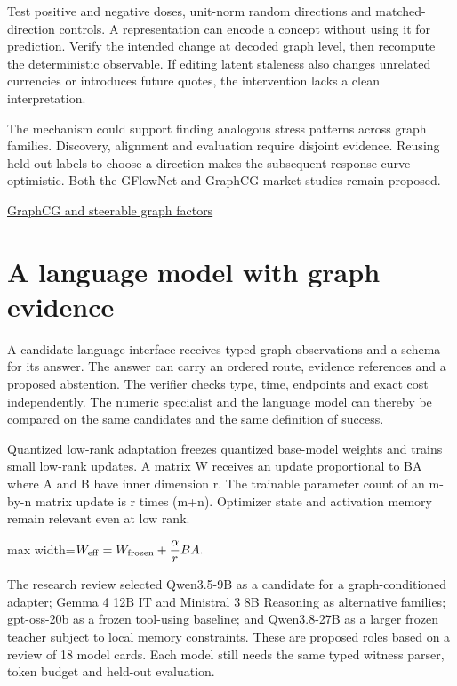 \documentclass[11pt,oneside,openany]{book}
\begin{document}
Test positive and negative doses, unit-norm random directions and matched-direction controls. A representation can encode a concept without using it for prediction. Verify the intended change at decoded graph level, then recompute the deterministic observable. If editing latent staleness also changes unrelated currencies or introduces future quotes, the intervention lacks a clean interpretation.

The mechanism could support finding analogous stress patterns across graph families. Discovery, alignment and evaluation require disjoint evidence. Reusing held-out labels to choose a direction makes the subsequent response curve optimistic. Both the GFlowNet and GraphCG market studies remain proposed.

{\small\sffamily\href{https://arxiv.org/abs/2401.17123}{GraphCG and steerable graph factors}\par}
\chapter{A language model with graph evidence}
A candidate language interface receives typed graph observations and a schema for its answer. The answer can carry an ordered route, evidence references and a proposed abstention. The verifier checks type, time, endpoints and exact cost independently. The numeric specialist and the language model can thereby be compared on the same candidates and the same definition of success.

Quantized low-rank adaptation freezes quantized base-model weights and trains small low-rank updates. A matrix W receives an update proportional to BA where A and B have inner dimension r. The trainable parameter count of an m-by-n matrix update is r times (m+n). Optimizer state and activation memory remain relevant even at low rank.

\begin{center}\begin{adjustbox}{max width=\linewidth}$\displaystyle W_{\rm eff}=W_{\rm frozen}+\frac{\alpha}{r}BA.$\end{adjustbox}\end{center}
The research review selected Qwen3.5-9B as a candidate for a graph-conditioned adapter; Gemma 4 12B IT and Ministral 3 8B Reasoning as alternative families; gpt-oss-20b as a frozen tool-using baseline; and Qwen3.8-27B as a larger frozen teacher subject to local memory constraints. These are proposed roles based on a review of 18 model cards. Each model still needs the same typed witness parser, token budget and held-out evaluation.
\end{document}

